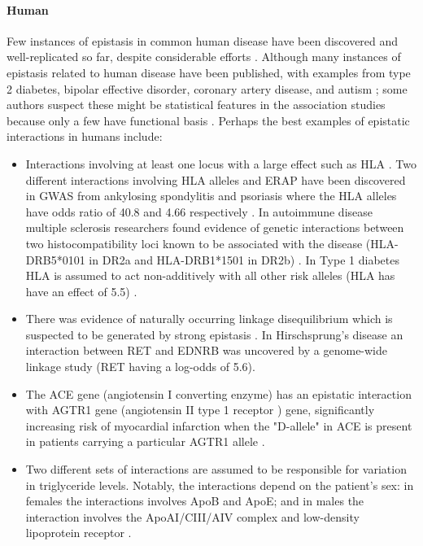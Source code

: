 \paragraph{Human}
Few instances of epistasis in common human disease have been discovered and well-replicated so far, despite considerable efforts \cite{zuk2012mystery}.
Although many instances of epistasis related to human disease have been published, with examples from type 2 diabetes\cite{wiltshire2006epistasis}, bipolar effective disorder\cite{jamra2007first}, coronary artery disease\cite{tsai2007renin}, and autism \cite{coutinho2007evidence}; some authors suspect these might be statistical features in the association studies because only a few have functional basis \cite{phillips2008epistasis}.
Perhaps the best examples of epistatic interactions in humans include:
\begin{itemize}
	\item Interactions involving at least one locus with a large effect such as HLA  \cite{zuk2012mystery}.
Two different interactions involving HLA alleles and ERAP have been discovered in GWAS from ankylosing spondylitis and psoriasis where the HLA alleles have odds ratio of 40.8 and 4.66 respectively \cite{evans2011interaction, genetic2010genome}.
In autoimmune disease multiple sclerosis researchers found evidence of genetic interactions between two histocompatibility loci known to be associated with the disease (HLA-DRB5*0101 in DR2a and HLA-DRB1*1501 in DR2b) \cite{gregersen2006functional}. 
In Type 1 diabetes HLA is assumed to act non-additively with all other risk alleles (HLA has have an effect of 5.5) \cite{barrett2009genome}.

	\item There was evidence of naturally occurring linkage disequilibrium which is suspected to be generated by strong epistasis \cite{phillips2008epistasis}.
In Hirschsprung's disease an interaction between RET and EDNRB was uncovered by a genome-wide linkage study (RET having a log-odds of 5.6). \cite{carrasquillo2002genome}

	\item The ACE gene (angiotensin I converting enzyme) has an epistatic interaction with AGTR1 gene (angiotensin II type 1 receptor ) gene, significantly increasing risk of myocardial infarction when the "D-allele" in ACE  is present in patients carrying a particular AGTR1 allele \cite{tiret1994synergistic}.

	\item Two different sets of interactions are assumed to be responsible for variation in triglyceride levels.
Notably, the interactions depend on the patient's sex: in females the interactions involves ApoB and ApoE;  and in males the interaction involves the ApoAI/CIII/AIV complex and low-density lipoprotein receptor \cite{nelson2001combinatorial}.


\end{itemize}
